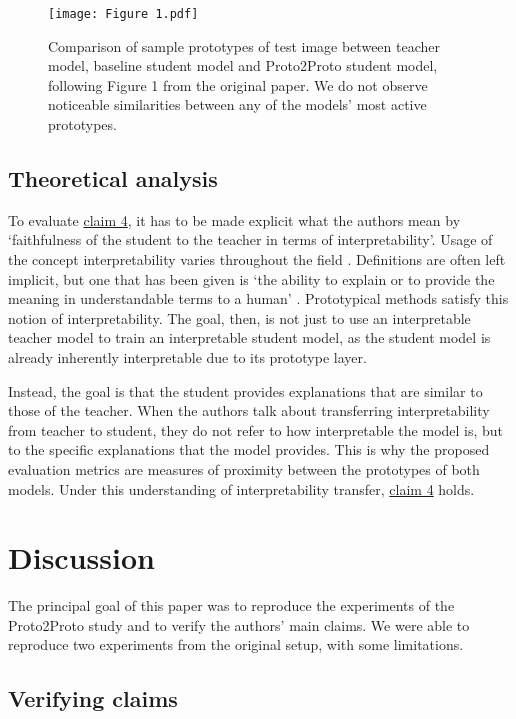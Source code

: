 \begin{figure}
    \centering
    \texttt{[image: Figure 1.pdf]}
    \caption{Comparison of sample prototypes of test image between teacher model, baseline student model and Proto2Proto student model, following Figure 1 from the original paper. We do not observe noticeable similarities between any of the models' most active prototypes.}
    \label{fig:local_analysis}
\end{figure}

\subsection{Theoretical analysis}
To evaluate \hyperlink{claim4}{claim 4}, it has to be made explicit what the authors mean by `faithfulness of the student to the teacher in terms of interpretability'. Usage of the concept interpretability varies throughout the field \citep{chakraborty2017interpretability}. Definitions are often left implicit, but one that has been given is `the ability to explain or to provide the meaning in understandable terms to a human' \citep[p.~93:5]{guidotti2018a}. Prototypical methods satisfy this notion of interpretability. The goal, then, is not just to use an interpretable teacher model to train an interpretable student model, as the student model is already inherently interpretable due to its prototype layer.\par
Instead, the goal is that the student provides explanations that are similar to those of the teacher. When the authors talk about transferring interpretability from teacher to student, they do not refer to how interpretable the model is, but to the specific explanations that the model provides. This is why the proposed evaluation metrics are measures of proximity between the prototypes of both models. Under this understanding of interpretability transfer, \hyperlink{claim4}{claim 4} holds.

\section{Discussion} \label{sec:discussion}

The principal goal of this paper was to reproduce the experiments of the Proto2Proto study and to verify the authors' main claims. We were able to reproduce two experiments from the original setup, with some limitations.\par
\subsection{Verifying claims}
